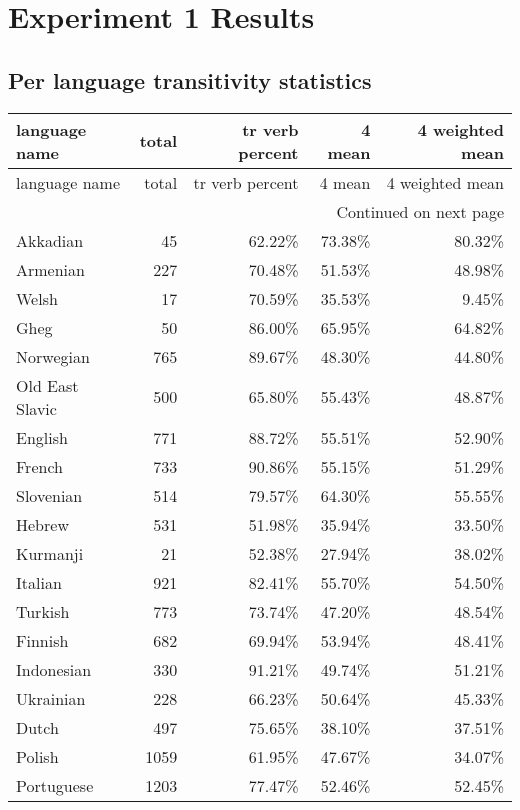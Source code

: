 \chapter{Experiment 1 Results}
\section{Per language transitivity statistics}
\begin{longtable}{lrrrr}
    \toprule
    language name & total & tr verb percent & 4 mean & 4 weighted mean \\
    \midrule
    \endfirsthead
    \toprule
    language name & total & tr verb percent & 4 mean & 4 weighted mean \\
    \midrule
    \endhead
    \midrule
    \multicolumn{5}{r}{Continued on next page} \\
    \midrule
    \endfoot
    \bottomrule
    \endlastfoot
    Akkadian & 45 & 62.22\% & 73.38\% & 80.32\% \\
    Armenian & 227 & 70.48\% & 51.53\% & 48.98\% \\
    Welsh & 17 & 70.59\% & 35.53\% & 9.45\% \\
    Gheg & 50 & 86.00\% & 65.95\% & 64.82\% \\
    Norwegian & 765 & 89.67\% & 48.30\% & 44.80\% \\
    Old East Slavic & 500 & 65.80\% & 55.43\% & 48.87\% \\
    English & 771 & 88.72\% & 55.51\% & 52.90\% \\
    French & 733 & 90.86\% & 55.15\% & 51.29\% \\
    Slovenian & 514 & 79.57\% & 64.30\% & 55.55\% \\
    Hebrew & 531 & 51.98\% & 35.94\% & 33.50\% \\
    Kurmanji & 21 & 52.38\% & 27.94\% & 38.02\% \\
    Italian & 921 & 82.41\% & 55.70\% & 54.50\% \\
    Turkish & 773 & 73.74\% & 47.20\% & 48.54\% \\
    Finnish & 682 & 69.94\% & 53.94\% & 48.41\% \\
    Indonesian & 330 & 91.21\% & 49.74\% & 51.21\% \\
    Ukrainian & 228 & 66.23\% & 50.64\% & 45.33\% \\
    Dutch & 497 & 75.65\% & 38.10\% & 37.51\% \\
    Polish & 1059 & 61.95\% & 47.67\% & 34.07\% \\
    Portuguese & 1203 & 77.47\% & 52.46\% & 52.45\% \\

\end{longtable}
